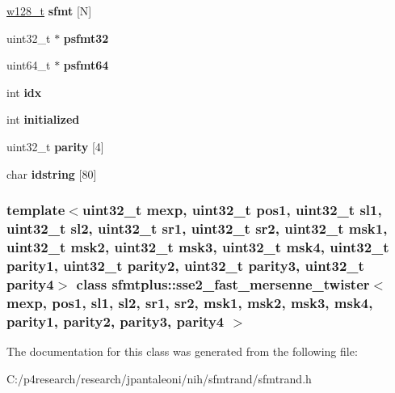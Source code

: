 \begin{DoxyCompactItemize}
\item 
\hypertarget{classsfmtplus_1_1sse2__fast__mersenne__twister_ab0eb025388f2016557c5faf801ac1b65}{
\hyperlink{unionsfmtplus_1_1sse2__fast__mersenne__twister_1_1w128__t}{w128\-\_\-t} {\bfseries sfmt} \mbox{[}\-N\mbox{]}}
\label{classsfmtplus_1_1sse2__fast__mersenne__twister_ab0eb025388f2016557c5faf801ac1b65}

\item 
\hypertarget{classsfmtplus_1_1sse2__fast__mersenne__twister_a4607224454b9e298b49b2db750d36885}{
uint32\-\_\-t $\ast$ {\bfseries psfmt32}}
\label{classsfmtplus_1_1sse2__fast__mersenne__twister_a4607224454b9e298b49b2db750d36885}

\item 
\hypertarget{classsfmtplus_1_1sse2__fast__mersenne__twister_aba210954cadedf9020db16b1e09274a0}{
uint64\-\_\-t $\ast$ {\bfseries psfmt64}}
\label{classsfmtplus_1_1sse2__fast__mersenne__twister_aba210954cadedf9020db16b1e09274a0}

\item 
\hypertarget{classsfmtplus_1_1sse2__fast__mersenne__twister_a985a8088290744af5893c25144aef58c}{
int {\bfseries idx}}
\label{classsfmtplus_1_1sse2__fast__mersenne__twister_a985a8088290744af5893c25144aef58c}

\item 
\hypertarget{classsfmtplus_1_1sse2__fast__mersenne__twister_aa0e6fe3e559895c1b65c71d39dbe30e3}{
int {\bfseries initialized}}
\label{classsfmtplus_1_1sse2__fast__mersenne__twister_aa0e6fe3e559895c1b65c71d39dbe30e3}

\item 
\hypertarget{classsfmtplus_1_1sse2__fast__mersenne__twister_a8486601a7ed82c754346b6fdabed7ac5}{
uint32\-\_\-t {\bfseries parity} \mbox{[}4\mbox{]}}
\label{classsfmtplus_1_1sse2__fast__mersenne__twister_a8486601a7ed82c754346b6fdabed7ac5}

\item 
\hypertarget{classsfmtplus_1_1sse2__fast__mersenne__twister_a573de14c1b184021d87682717a36e129}{
char {\bfseries idstring} \mbox{[}80\mbox{]}}
\label{classsfmtplus_1_1sse2__fast__mersenne__twister_a573de14c1b184021d87682717a36e129}

\end{DoxyCompactItemize}
\subsubsection*{template$<$uint32\-\_\-t mexp, uint32\-\_\-t pos1, uint32\-\_\-t sl1, uint32\-\_\-t sl2, uint32\-\_\-t sr1, uint32\-\_\-t sr2, uint32\-\_\-t msk1, uint32\-\_\-t msk2, uint32\-\_\-t msk3, uint32\-\_\-t msk4, uint32\-\_\-t parity1, uint32\-\_\-t parity2, uint32\-\_\-t parity3, uint32\-\_\-t parity4$>$ class sfmtplus\-::sse2\-\_\-fast\-\_\-mersenne\-\_\-twister$<$ mexp, pos1, sl1, sl2, sr1, sr2, msk1, msk2, msk3, msk4, parity1, parity2, parity3, parity4 $>$}



\-The documentation for this class was generated from the following file\-:\begin{DoxyCompactItemize}
\item 
\-C\-:/p4research/research/jpantaleoni/nih/sfmtrand/sfmtrand.\-h\end{DoxyCompactItemize}
